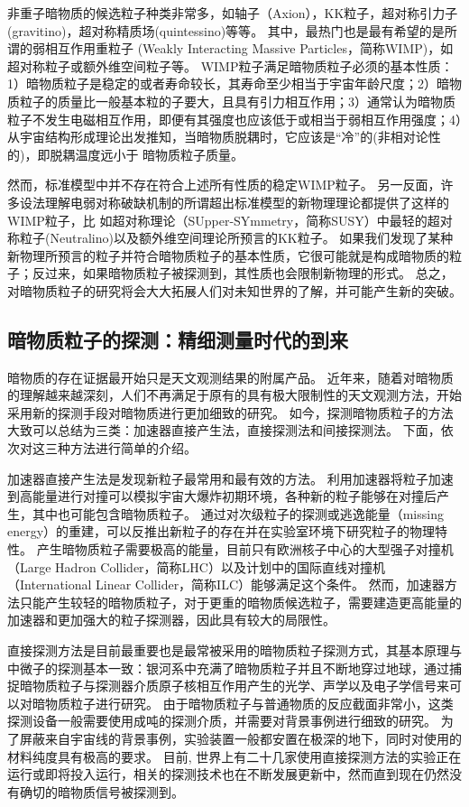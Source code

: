 非重子暗物质的候选粒子种类非常多，如轴子（Axion），KK粒子，超对称引力子(gravitino)，超对称精质场(quintessino)等等\parencite{bixiaojun}。
其中，最热门也是最有希望的是所谓的弱相互作用重粒子 (Weakly Interacting Massive Particles，简称WIMP)，如超对称粒子或额外维空间粒子等。
WIMP粒子满足暗物质粒子必须的基本性质：1）暗物质粒子是稳定的或者寿命较长，其寿命至少相当于宇宙年龄尺度；2）暗物质粒子的质量比一般基本粒的子要大，且具有引力相互作用；3）通常认为暗物质粒子不发生电磁相互作用，即便有其强度也应该低于或相当于弱相互作用强度；4）从宇宙结构形成理论出发推知，当暗物质脱耦时，它应该是“冷”的(非相对论性的)，即脱耦温度远小于 暗物质粒子质量。

然而，标准模型中并不存在符合上述所有性质的稳定WIMP粒子。
另一反面，许多设法理解电弱对称破缺机制的所谓超出标准模型的新物理理论都提供了这样的WIMP粒子，比 如超对称理论（SUpper-SYmmetry，简称SUSY）中最轻的超对称粒子(Neutralino)以及额外维空间理论所预言的KK粒子。
如果我们发现了某种新物理所预言的粒子并符合暗物质粒子的基本性质，它很可能就是构成暗物质的粒子；反过来，如果暗物质粒子被探测到，其性质也会限制新物理的形式。
总之，对暗物质粒子的研究将会大大拓展人们对未知世界的了解，并可能产生新的突破。

\subsection{暗物质粒子的探测：精细测量时代的到来}
暗物质的存在证据最开始只是天文观测结果的附属产品。
近年来，随着对暗物质的理解越来越深刻，人们不再满足于原有的具有极大限制性的天文观测方法，开始采用新的探测手段对暗物质进行更加细致的研究。
如今，探测暗物质粒子的方法大致可以总结为三类：加速器直接产生法，直接探测法和间接探测法。
下面，依次对这三种方法进行简单的介绍。

加速器直接产生法是发现新粒子最常用和最有效的方法。
利用加速器将粒子加速到高能量进行对撞可以模拟宇宙大爆炸初期环境，各种新的粒子能够在对撞后产生，其中也可能包含暗物质粒子。
通过对次级粒子的探测或逃逸能量（missing energy）的重建，可以反推出新粒子的存在并在实验室环境下研究粒子的物理特性。
产生暗物质粒子需要极高的能量，目前只有欧洲核子中心的大型强子对撞机（Large Hadron Collider，简称LHC）以及计划中的国际直线对撞机（International Linear Collider，简称ILC）能够满足这个条件。
然而，加速器方法只能产生较轻的暗物质粒子，对于更重的暗物质候选粒子，需要建造更高能量的加速器和更加强大的粒子探测器，因此具有较大的局限性。

直接探测方法是目前最重要也是最常被采用的暗物质粒子探测方式，其基本原理与中微子的探测基本一致：银河系中充满了暗物质粒子并且不断地穿过地球，通过捕捉暗物质粒子与探测器介质原子核相互作用产生的光学、声学以及电子学信号来可以对暗物质粒子进行研究。
由于暗物质粒子与普通物质的反应截面非常小，这类探测设备一般需要使用成吨的探测介质，并需要对背景事例进行细致的研究。
为了屏蔽来自宇宙线的背景事例，实验装置一般都安置在极深的地下，同时对使用的材料纯度具有极高的要求。
目前, 世界上有二十几家使用直接探测方法的实验正在运行或即将投入运行，相关的探测技术也在不断发展更新中，然而直到现在仍然没有确切的暗物质信号被探测到。

